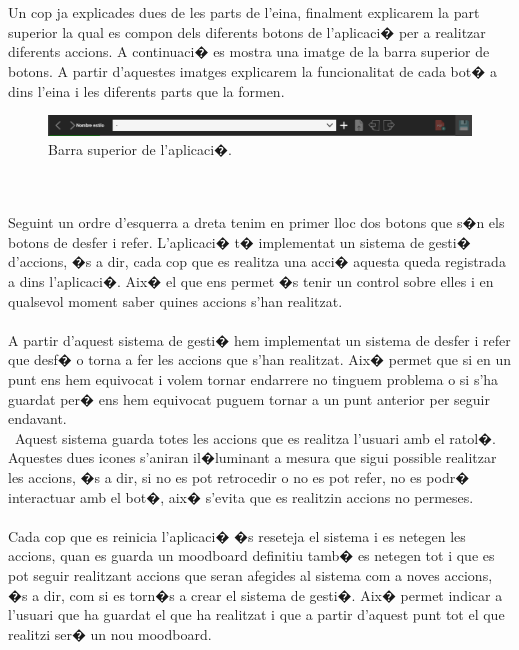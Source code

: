 \documentclass[12pt,a4paper,openright,oneside]{article}
\numberwithin{equation}{section}
\theoremstyle{definition}
\begin{document}
\\\\
Un cop ja explicades dues de les parts de l'eina, finalment explicarem la part superior la qual es compon dels diferents botons de l'aplicaci� per a realitzar diferents accions. A continuaci� es mostra una imatge de la barra superior de botons. A partir d'aquestes imatges explicarem la funcionalitat de cada bot� a dins l'eina i les diferents parts que la formen.
\begin{figure}[h!]
\begin{center}
\includegraphics[width=\textwidth]{topbar}
\caption{Barra superior de l'aplicaci�.}
\end{center}
\end{figure}
\\\\
Seguint un ordre d'esquerra a dreta tenim en primer lloc dos botons que s�n els botons de desfer i refer. L'aplicaci� t� implementat un sistema de gesti� d'accions, �s a dir, cada cop que es realitza una acci� aquesta queda registrada a dins l'aplicaci�. Aix� el que ens permet �s tenir un control sobre elles i en qualsevol moment saber quines accions s'han realitzat. \\\\
A partir d'aquest sistema de gesti� hem implementat un sistema de desfer i refer que desf� o torna a fer les accions que s'han realitzat. Aix� permet que si en un punt ens hem equivocat i volem tornar endarrere no tinguem problema o si s'ha guardat per� ens hem equivocat puguem tornar a un punt anterior per seguir endavant. \\\
Aquest sistema guarda totes les accions que es realitza l'usuari amb el ratol�. Aquestes dues icones s'aniran il�luminant a mesura que sigui possible realitzar les accions, �s a dir, si no es pot retrocedir o no es pot refer, no es podr� interactuar amb el bot�, aix� s'evita que es realitzin accions no permeses. \\\\
Cada cop que es reinicia l'aplicaci� �s reseteja el sistema i es netegen les accions, quan es guarda un moodboard definitiu tamb� es netegen tot i que es pot seguir realitzant accions que seran afegides al sistema com a noves accions, �s a dir, com si es torn�s a crear el sistema de gesti�. Aix� permet indicar a l'usuari que ha guardat el que ha realitzat i que a partir d'aquest punt tot el que realitzi ser� un nou moodboard.\\\\
\end{document}
